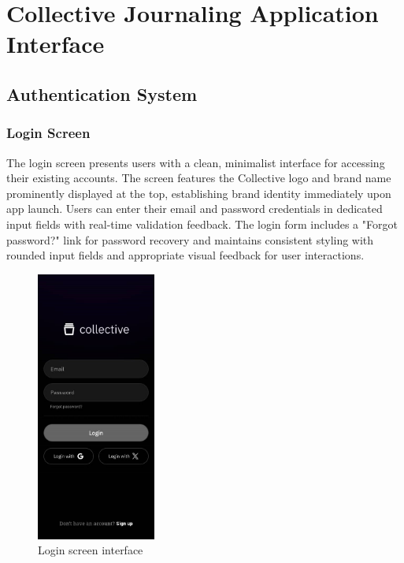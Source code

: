 \section{Collective Journaling Application Interface}

\subsection{Authentication System}

\subsubsection{Login Screen}

The login screen presents users with a clean, minimalist interface for accessing their existing accounts. The screen features the Collective logo and brand name prominently displayed at the top, establishing brand identity immediately upon app launch. Users can enter their email and password credentials in dedicated input fields with real-time validation feedback. The login form includes a "Forgot password?" link for password recovery and maintains consistent styling with rounded input fields and appropriate visual feedback for user interactions.

\begin{samepage}
\begin{figure}[H]
\centering
\includegraphics[width=0.35\textwidth]{files/imgs/prototype/auth_login.jpeg}
\caption{Login screen interface}
\label{fig:login-screen}
\end{figure}
\end{samepage}

